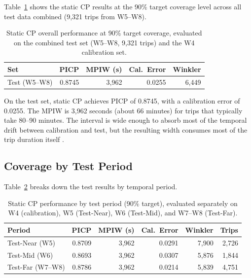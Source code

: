\documentclass[12pt, a4paper, oneside]{report}
\begin{document}
Table~\ref{tab:exp1_overall} shows the static CP results at the 90\% target coverage level across all test data combined (9,321 trips from W5--W8).

\begin{table}[H]
\centering
\caption{Static CP overall performance at 90\% target coverage, evaluated on the combined test set (W5--W8, 9,321 trips) and the W4 calibration set.}
\label{tab:exp1_overall}
\begin{tabular}{lrrrr}
\toprule
\textbf{Set} & \textbf{PICP} & \textbf{MPIW (s)} & \textbf{Cal.\ Error} & \textbf{Winkler} \\
\midrule
Test (W5--W8) & 0.8745 & 3,962 & 0.0255 & 6,449 \\
\bottomrule
\end{tabular}
\end{table}

On the test set, static CP achieves PICP of 0.8745, with a calibration error of 0.0255. The MPIW is 3,962 seconds (about 66 minutes) for trips that typically take 80--90 minutes. The interval is wide enough to absorb most of the temporal drift between calibration and test, but the resulting width consumes most of the trip duration itself \cite{Barber2023816}.

\subsection{Coverage by Test Period}

Table~\ref{tab:exp1_period} breaks down the test results by temporal period.

\begin{table}[H]
\centering
\caption{Static CP performance by test period (90\% target), evaluated separately on W4 (calibration), W5 (Test-Near), W6 (Test-Mid), and W7--W8 (Test-Far).}
\label{tab:exp1_period}
\begin{tabular}{lrrrrr}
\toprule
\textbf{Period} & \textbf{PICP} & \textbf{MPIW (s)} & \textbf{Cal.\ Error} & \textbf{Winkler} & \textbf{Trips} \\
\midrule
Test-Near (W5) & 0.8709 & 3,962 & 0.0291 & 7,900 & 2,726 \\
Test-Mid (W6) & 0.8693 & 3,962 & 0.0307 & 5,876 & 1,844 \\
Test-Far (W7--W8) & 0.8786 & 3,962 & 0.0214 & 5,839 & 4,751 \\
\bottomrule
\end{tabular}
\end{table}
\end{document}
